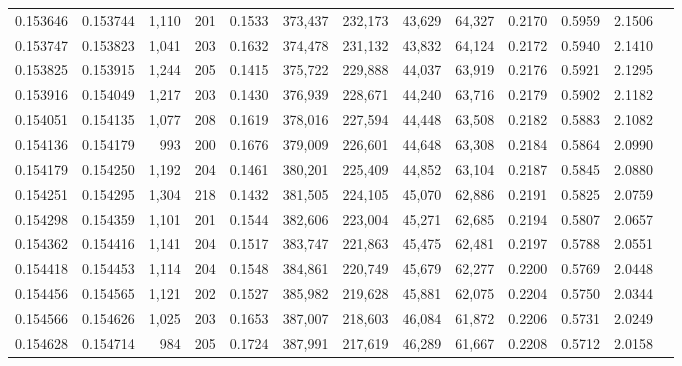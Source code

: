 \begin{tabular}{rrrrrrrrrrrrr}
0.153646 & 0.153744 & 1,110 & 201 &                                     0.1533 & 373,437 & 232,173 &  43,629 &  64,327 & 0.2170 & 0.5959 & 2.1506 \\
0.153747 & 0.153823 & 1,041 & 203 &                                     0.1632 & 374,478 & 231,132 &  43,832 &  64,124 & 0.2172 & 0.5940 & 2.1410 \\
0.153825 & 0.153915 & 1,244 & 205 &                                     0.1415 & 375,722 & 229,888 &  44,037 &  63,919 & 0.2176 & 0.5921 & 2.1295 \\
0.153916 & 0.154049 & 1,217 & 203 &                                     0.1430 & 376,939 & 228,671 &  44,240 &  63,716 & 0.2179 & 0.5902 & 2.1182 \\
0.154051 & 0.154135 & 1,077 & 208 &                                     0.1619 & 378,016 & 227,594 &  44,448 &  63,508 & 0.2182 & 0.5883 & 2.1082 \\
0.154136 & 0.154179 &   993 & 200 &                                     0.1676 & 379,009 & 226,601 &  44,648 &  63,308 & 0.2184 & 0.5864 & 2.0990 \\
0.154179 & 0.154250 & 1,192 & 204 &                                     0.1461 & 380,201 & 225,409 &  44,852 &  63,104 & 0.2187 & 0.5845 & 2.0880 \\
0.154251 & 0.154295 & 1,304 & 218 &                                     0.1432 & 381,505 & 224,105 &  45,070 &  62,886 & 0.2191 & 0.5825 & 2.0759 \\
0.154298 & 0.154359 & 1,101 & 201 &                                     0.1544 & 382,606 & 223,004 &  45,271 &  62,685 & 0.2194 & 0.5807 & 2.0657 \\
0.154362 & 0.154416 & 1,141 & 204 &                                     0.1517 & 383,747 & 221,863 &  45,475 &  62,481 & 0.2197 & 0.5788 & 2.0551 \\
0.154418 & 0.154453 & 1,114 & 204 &                                     0.1548 & 384,861 & 220,749 &  45,679 &  62,277 & 0.2200 & 0.5769 & 2.0448 \\
0.154456 & 0.154565 & 1,121 & 202 &                                     0.1527 & 385,982 & 219,628 &  45,881 &  62,075 & 0.2204 & 0.5750 & 2.0344 \\
0.154566 & 0.154626 & 1,025 & 203 &                                     0.1653 & 387,007 & 218,603 &  46,084 &  61,872 & 0.2206 & 0.5731 & 2.0249 \\
0.154628 & 0.154714 &   984 & 205 &                                     0.1724 & 387,991 & 217,619 &  46,289 &  61,667 & 0.2208 & 0.5712 & 2.0158 \\

\end{tabular}
